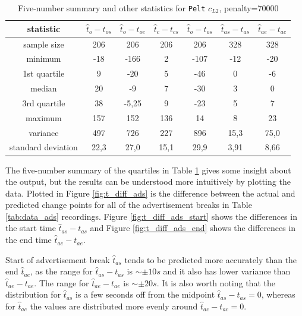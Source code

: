 \begin{table}[H]
    \begin{center}
    \begin{tabular}{|c|c|c|c|c|c|c|}
        \hline
        \textbf{statistic} & $\hat{t}_o-t_{os}$ & $\hat{t}_o-t_{oe}$ & $\hat{t}_c-t_{cs}$ & $\hat{t}_o-t_{os}$ & $\hat{t}_{as}-t_{as}$ & $\hat{t}_{ae}-t_{ae}$  \\ \hline
        sample size &  206 & 206 & 206 & 206 & 328 & 328 \\ \hline
        minimum & -18 & -166 & 2 & -107 & -12 & -20\\ \hline
        1st quartile & 9 & -20 & 5 & -46 & 0 & -6\\ \hline
        median & 20 & -9 & 7 & -30 & 3 & 0\\ \hline
        3rd quartile & 38 & -5,25 & 9 & -23 & 5 & 7\\ \hline
        maximum & 157 & 152	& 136 & 14 & 8 & 23\\ \hline
        variance & 497 & 726 & 227 & 896 & 15,3 & 75,0\\ \hline
        standard deviation & 22,3 & 27,0 & 15,1 & 29,9 & 3,91 &	8,66\\ \hline
    \end{tabular}
    \end{center}
    \caption{Five-number summary and other statistics for \texttt{Pelt} $c_{L2}$, penalty=70000}
    \label{tab:statistics_pelt}
\end{table}

The five-number summary of the quartiles in Table \ref{tab:statistics_pelt} gives some insight about the output, but the results can be understood more intuitively by plotting the data. Plotted in Figure \ref{fig:t_diff_ads} is the difference between the actual and predicted change points for all of the advertisement breaks in Table \ref{tab:data_ads} recordings. Figure \ref{fig:t_diff_ads_start} shows the differences in the start time $\hat{t}_{as}-t_{as}$ and Figure \ref{fig:t_diff_ads_end} shows the differences in the end time $\hat{t}_{ae}-t_{ae}$. 

Start of advertisement break $\hat{t}_{as}$ tends to be predicted more accurately than the end $\hat{t}_{ae}$, as the range for $\hat{t}_{as}-t_{as}$ is $\sim \pm 10 s$ and it also has lower variance than $\hat{t}_{ae}-t_{ae}$. The range for $\hat{t}_{ae}-t_{ae}$ is $\sim \pm 20 s$. It is also worth noting that the distribution for $\hat{t}_{as}$ is a few seconds off from the midpoint $\hat{t}_{as}-t_{as}=0$, whereas for $\hat{t}_{ac}$ the values are distributed more evenly around $\hat{t}_{ac}-t_{ac}=0$.

